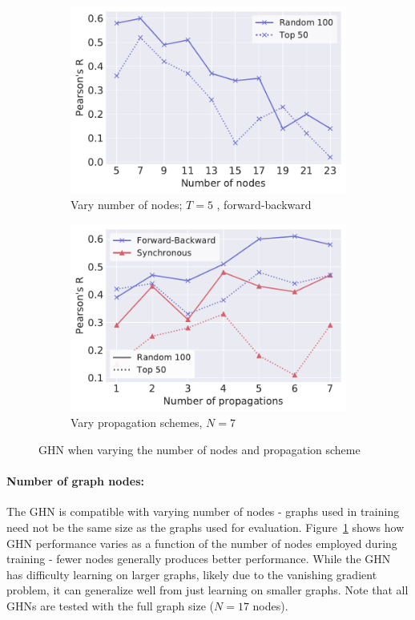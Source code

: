 \begin{figure}[t]
\vspace{-1.0cm}
 \begin{center}
\begin{subfigure}{.48\textwidth}
  \includegraphics[width=0.8\linewidth]{figures/nodes.pdf}
  \caption{Vary number of nodes; $T=5$ , forward-backward}
  \label{fig:sfig2}
\end{subfigure}
\begin{subfigure}{.48\textwidth}
  \centering
  \includegraphics[width=0.8\linewidth]{figures/tsteps.pdf}
  \caption{Vary propagation schemes, $N=7$ }
  \label{fig:sfig1}
\end{subfigure}%
\caption{ GHN when varying the number of nodes and propagation scheme}
\label{fig:ghn_hyps}
\end{center}
\vspace{-0.5cm}
\end{figure}
\fi

\vspace{-0.25cm}
\paragraph{Number of graph nodes:}
The GHN is compatible with varying number of nodes - graphs used in training need not be the same
size as the graphs used for evaluation. Figure~\ref{fig:sfig2} shows how GHN performance varies as a
function of the number of nodes employed during training - fewer nodes generally produces better
performance. While the GHN has difficulty learning on larger graphs, likely due to the vanishing
gradient problem, it can generalize well from just learning on smaller graphs. Note that all GHNs
are  tested with the full graph size ($N=17$ nodes).

